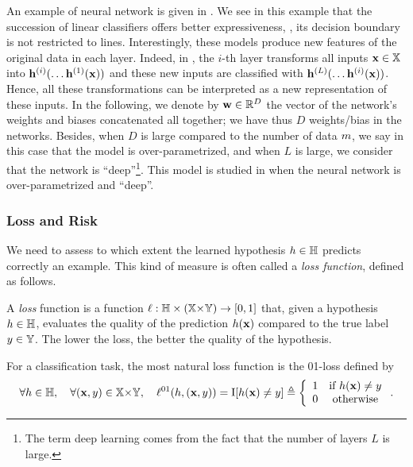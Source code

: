 An example of neural network is given in .
We see in this example that the succession of linear classifiers offers better expressiveness, \ie, its decision boundary is not restricted to lines.
Interestingly, these models produce new features of the original data in each layer.
Indeed, in , the $i$-th layer transforms all inputs $\mathbf{x}\in\mathbb{X}$ into $\mathbf{h}^{(i)}(\dots\mathbf{h}^{(1)}(\mathbf{x}))$ and these new inputs are classified with $\mathbf{h}^{(L)}(\dots\mathbf{h}^{(i)}(\mathbf{x}))$.
Hence, all these transformations can be interpreted as a new representation of these inputs.
In the following, we denote by $\mathbf{w}\in\mathbb{R}^D$ the vector of the network's weights and biases concatenated all together; we have thus $D$ weights/bias in the networks.
Besides, when $D$ is large compared to the number of data $m$, we say in this case that the model is over-parametrized, and when $L$ is large, we consider that the network is ``deep''\footnote{The term deep learning comes from the fact that the number of layers $L$ is large.}.
This model is studied in  when the neural network is over-parametrized and ``deep''.

\subsubsection{Loss and Risk}
\label{chap:intro:sec:loss-risk}

We need to assess to which extent the learned hypothesis $h\in\mathbb{H}$ predicts correctly an example. 
This kind of measure is often called a {\it loss function}, defined as follows.

\begin{definition}
A {\it loss} function is a function $\ell: \mathbb{H}\times (\mathbb{X}{\times}\mathbb{Y}) \to [0, 1]$ that, given a hypothesis $h\in\mathbb{H}$, evaluates the quality of the prediction $h(\mathbf{x})$ compared to the true label $y\in\mathbb{Y}$.
The lower the loss, the better the quality of the hypothesis.
\end{definition}

For a classification task, the most natural loss function is the 01-loss defined by
\begin{align*}
    \forall h\in\mathbb{H}, \quad \forall(\mathbf{x},y)\in\mathbb{X}{\times}\mathbb{Y},\quad \ell^{01}(h, (\mathbf{x},y)) =\operatorname{I}[h(\mathbf{x})\ne y] \triangleq \left\{\begin{array}{cc}
        1 & \text{if}\  h(\mathbf{x}) \ne y\\
        0 & \text{otherwise}
    \end{array} \right..
\end{align*}

